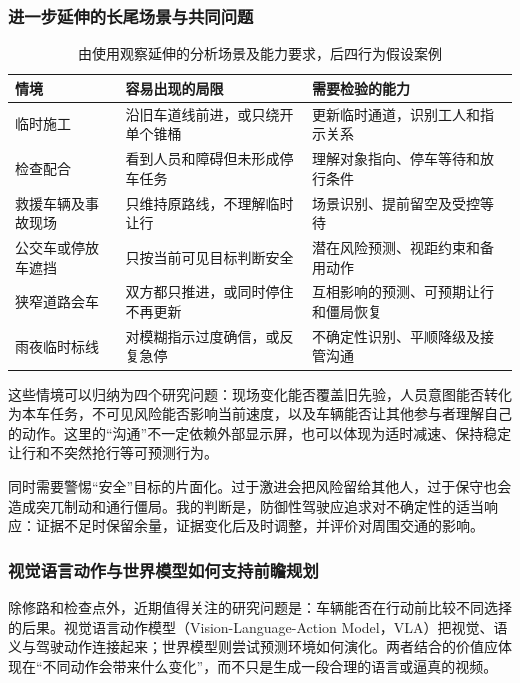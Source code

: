 \documentclass[UTF8,zihao=-4,fontset=windows]{ctexart}
\begin{document}
\subsubsection{进一步延伸的长尾场景与共同问题}
\begin{table}[H]\centering\small\caption{由使用观察延伸的分析场景及能力要求，后四行为假设案例}
\begin{tabularx}{\textwidth}{p{2.1cm}XX}\toprule
情境 & 容易出现的局限 & 需要检验的能力\\\midrule
临时施工 & 沿旧车道线前进，或只绕开单个锥桶 & 更新临时通道，识别工人和指示关系\\
检查配合 & 看到人员和障碍但未形成停车任务 & 理解对象指向、停车等待和放行条件\\
救援车辆及事故现场 & 只维持原路线，不理解临时让行 & 场景识别、提前留空及受控等待\\
公交车或停放车遮挡 & 只按当前可见目标判断安全 & 潜在风险预测、视距约束和备用动作\\
狭窄道路会车 & 双方都只推进，或同时停住不再更新 & 互相影响的预测、可预期让行和僵局恢复\\
雨夜临时标线 & 对模糊指示过度确信，或反复急停 & 不确定性识别、平顺降级及接管沟通\\\bottomrule\end{tabularx}\end{table}
这些情境可以归纳为四个研究问题：现场变化能否覆盖旧先验，人员意图能否转化为本车任务，不可见风险能否影响当前速度，以及车辆能否让其他参与者理解自己的动作。这里的“沟通”不一定依赖外部显示屏，也可以体现为适时减速、保持稳定让行和不突然抢行等可预测行为。

同时需要警惕“安全”目标的片面化。过于激进会把风险留给其他人，过于保守也会造成突兀制动和通行僵局。我的判断是，防御性驾驶应追求对不确定性的适当响应：证据不足时保留余量，证据变化后及时调整，并评价对周围交通的影响。
\subsubsection{视觉语言动作与世界模型如何支持前瞻规划}
除修路和检查点外，近期值得关注的研究问题是：车辆能否在行动前比较不同选择的后果。视觉语言动作模型（Vision-Language-Action Model，VLA）把视觉、语义与驾驶动作连接起来；世界模型则尝试预测环境如何演化。两者结合的价值应体现在“不同动作会带来什么变化”，而不只是生成一段合理的语言或逼真的视频。
\end{document}
